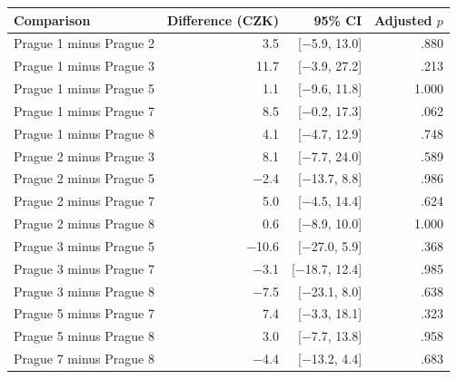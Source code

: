\begin{tabular}{lrrr}
  \toprule
Comparison & Difference (CZK) & 95\% CI & Adjusted $p$ \\ 
  \midrule
Prague 1 minus Prague 2 & 3.5 & [$-$5.9, 13.0] & .880 \\ 
  Prague 1 minus Prague 3 & 11.7 & [$-$3.9, 27.2] & .213 \\ 
  Prague 1 minus Prague 5 & 1.1 & [$-$9.6, 11.8] & 1.000 \\ 
  Prague 1 minus Prague 7 & 8.5 & [$-$0.2, 17.3] & .062 \\ 
  Prague 1 minus Prague 8 & 4.1 & [$-$4.7, 12.9] & .748 \\ 
  Prague 2 minus Prague 3 & 8.1 & [$-$7.7, 24.0] & .589 \\ 
  Prague 2 minus Prague 5 & $-$2.4 & [$-$13.7, 8.8] & .986 \\ 
  Prague 2 minus Prague 7 & 5.0 & [$-$4.5, 14.4] & .624 \\ 
  Prague 2 minus Prague 8 & 0.6 & [$-$8.9, 10.0] & 1.000 \\ 
  Prague 3 minus Prague 5 & $-$10.6 & [$-$27.0, 5.9] & .368 \\ 
  Prague 3 minus Prague 7 & $-$3.1 & [$-$18.7, 12.4] & .985 \\ 
  Prague 3 minus Prague 8 & $-$7.5 & [$-$23.1, 8.0] & .638 \\ 
  Prague 5 minus Prague 7 & 7.4 & [$-$3.3, 18.1] & .323 \\ 
  Prague 5 minus Prague 8 & 3.0 & [$-$7.7, 13.8] & .958 \\ 
  Prague 7 minus Prague 8 & $-$4.4 & [$-$13.2, 4.4] & .683 \\ 
   \bottomrule
\end{tabular}
